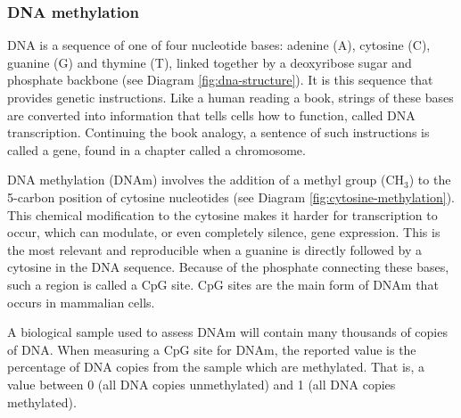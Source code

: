 \documentclass{article} %
\begin{document}
\subsubsection{DNA methylation}
DNA is a sequence of one of four nucleotide bases: adenine (A), cytosine (C), guanine (G) and thymine (T), linked together by a deoxyribose sugar and phosphate backbone (see Diagram \ref{fig:dna-structure}). It is this sequence that provides genetic instructions. Like a human reading a book, strings of these bases are converted into information that tells cells how to function, called DNA transcription. Continuing the book analogy, a sentence of such instructions is called a gene, found in a chapter called a chromosome.

DNA methylation (DNAm) involves the addition of a methyl group (CH\(_3\)) to the 5-carbon position of cytosine nucleotides (see Diagram \ref{fig:cytosine-methylation}). This chemical modification to the cytosine makes it harder for transcription to occur, which can modulate, or even completely silence, gene expression. This is the most relevant and reproducible when a guanine is directly followed by a cytosine in the DNA sequence. Because of the phosphate connecting these bases, such a region is called a CpG site. CpG sites are the main form of DNAm that occurs in mammalian cells.

A biological sample used to assess DNAm will contain many thousands of copies of DNA. When measuring a CpG site for DNAm, the reported value is the percentage of DNA copies from the sample which are methylated. That is, a value between 0 (all DNA copies unmethylated) and 1 (all DNA copies methylated).

\end{document}

